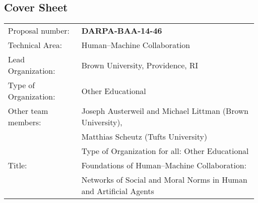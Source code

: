 \documentclass[12pt]{article}
\begin{document}
\titleformat{\section}[block]{\Large\bfseries\filcenter}{\thesection}{1em}{}



\begin{titlepage}


\section*{Cover Sheet} 
\vspace{5mm}

\noindent \begin{tabular}{ll}

\vspace{2mm}
Proposal number: & {\bf DARPA-BAA-14-46}\\

\vspace{2mm}
Technical Area:          & Human--Machine Collaboration \\ 


  Lead Organization: & Brown University, Providence, RI \\
\vspace{2mm}
  Type of Organization: & Other Educational\\
  Other team members: & Joseph Austerweil and Michael
Littman (Brown University), \\
  & Matthias Scheutz (Tufts University)\\
\vspace{2mm}
  & Type of Organization for all: Other Educational\\

Title:          & Foundations of Human--Machine Collaboration: \\ 
\vspace{2mm}
		& Networks of Social and Moral Norms in Human and Artificial Agents \\


\end{tabular}
\end{titlepage}
\end{document}
